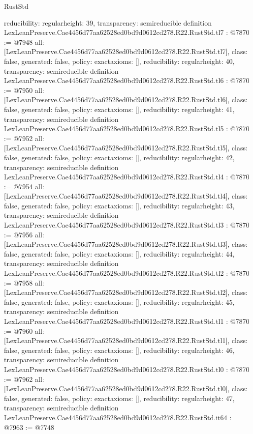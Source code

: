\begin{lexlean}{RustStd}
\begin{coremodule}
{  reducibility: regular{height: 39},
  transparency: semireducible
}
definition LexLeanPreserve.Cae4456d77aa62528ed0bd9d0612cd278.R22.RustStd.tl7 : @7870 := @7948 {
  all: [LexLeanPreserve.Cae4456d77aa62528ed0bd9d0612cd278.R22.RustStd.tl7],
  class: false,
  generated: false,
  policy: exact{axioms: []},
  reducibility: regular{height: 40},
  transparency: semireducible
}
definition LexLeanPreserve.Cae4456d77aa62528ed0bd9d0612cd278.R22.RustStd.tl6 : @7870 := @7950 {
  all: [LexLeanPreserve.Cae4456d77aa62528ed0bd9d0612cd278.R22.RustStd.tl6],
  class: false,
  generated: false,
  policy: exact{axioms: []},
  reducibility: regular{height: 41},
  transparency: semireducible
}
definition LexLeanPreserve.Cae4456d77aa62528ed0bd9d0612cd278.R22.RustStd.tl5 : @7870 := @7952 {
  all: [LexLeanPreserve.Cae4456d77aa62528ed0bd9d0612cd278.R22.RustStd.tl5],
  class: false,
  generated: false,
  policy: exact{axioms: []},
  reducibility: regular{height: 42},
  transparency: semireducible
}
definition LexLeanPreserve.Cae4456d77aa62528ed0bd9d0612cd278.R22.RustStd.tl4 : @7870 := @7954 {
  all: [LexLeanPreserve.Cae4456d77aa62528ed0bd9d0612cd278.R22.RustStd.tl4],
  class: false,
  generated: false,
  policy: exact{axioms: []},
  reducibility: regular{height: 43},
  transparency: semireducible
}
definition LexLeanPreserve.Cae4456d77aa62528ed0bd9d0612cd278.R22.RustStd.tl3 : @7870 := @7956 {
  all: [LexLeanPreserve.Cae4456d77aa62528ed0bd9d0612cd278.R22.RustStd.tl3],
  class: false,
  generated: false,
  policy: exact{axioms: []},
  reducibility: regular{height: 44},
  transparency: semireducible
}
definition LexLeanPreserve.Cae4456d77aa62528ed0bd9d0612cd278.R22.RustStd.tl2 : @7870 := @7958 {
  all: [LexLeanPreserve.Cae4456d77aa62528ed0bd9d0612cd278.R22.RustStd.tl2],
  class: false,
  generated: false,
  policy: exact{axioms: []},
  reducibility: regular{height: 45},
  transparency: semireducible
}
definition LexLeanPreserve.Cae4456d77aa62528ed0bd9d0612cd278.R22.RustStd.tl1 : @7870 := @7960 {
  all: [LexLeanPreserve.Cae4456d77aa62528ed0bd9d0612cd278.R22.RustStd.tl1],
  class: false,
  generated: false,
  policy: exact{axioms: []},
  reducibility: regular{height: 46},
  transparency: semireducible
}
definition LexLeanPreserve.Cae4456d77aa62528ed0bd9d0612cd278.R22.RustStd.tl0 : @7870 := @7962 {
  all: [LexLeanPreserve.Cae4456d77aa62528ed0bd9d0612cd278.R22.RustStd.tl0],
  class: false,
  generated: false,
  policy: exact{axioms: []},
  reducibility: regular{height: 47},
  transparency: semireducible
}
definition LexLeanPreserve.Cae4456d77aa62528ed0bd9d0612cd278.R22.RustStd.it64 : @7963 := @7748 {
}
\end{coremodule}
\end{lexlean}
